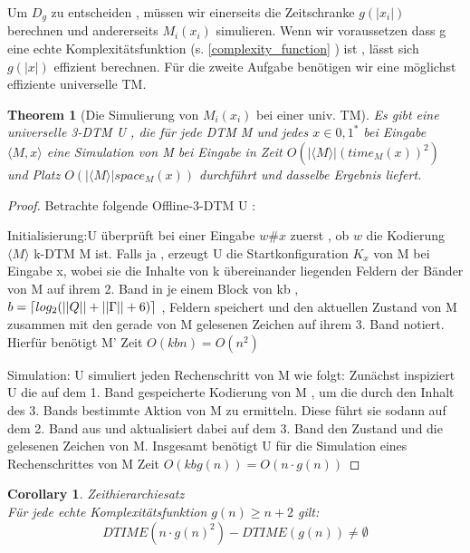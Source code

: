 \documentclass{article}
\newtheorem{theorem}{Theorem}
\newtheorem{corollary}{Corollary}[theorem]
\def\mathify#1{\ifmmode{#1}\else\mbox{$#1$}\fi} %
\newcommand{\ceil}[1]{\mathify{\left\lceil {#1}\right\rceil}}
\begin{document}
	Um $D_g$ zu entscheiden , müssen wir einerseits die Zeitschranke $g(|x_i|) $ berechnen und andererseits $M_i(x_i)$ simulieren. Wenn wir voraussetzen dass g eine echte Komplexitätsfunktion (s. \ref{complexity_function} ) ist , lässt sich $g(|x|)$ effizient berechnen. Für die zweite Aufgabe benötigen wir eine möglichst effiziente universelle TM.
	
	\begin{theorem}[Die Simulierung von $M_i(x_i)$ bei einer univ.  TM] \label{35}
	Es gibt eine universelle 3-DTM U , die für jede DTM M und jedes $x\in {0 ,1}^*$ bei Eingabe $\langle M , x \rangle$ eine Simulation von M bei Eingabe in Zeit $O(|\langle M \rangle|(time_M(x))^2) $ und Platz $O( | \langle M \rangle | space_M(x))$ durchführt und dasselbe Ergebnis liefert.
	\end{theorem}
	\begin{proof}
		Betrachte folgende Offline-3-DTM U : \\
	\par{Initialisierung:}U überprüft bei einer Eingabe $w\#x$ zuerst , ob $w$ die Kodierung $\langle M \rangle$ k-DTM M ist. Falls ja , erzeugt U die Startkonfiguration $K_x$ von M bei Eingabe x, wobei sie die Inhalte von k übereinander liegenden Feldern der Bänder von M auf ihrem 2. Band in je einem Block von kb , \\$b=\ceil{log_2(||Q|| + ||\Gamma|| + 6)} $ , Feldern speichert und den aktuellen Zustand von M zusammen mit den gerade von M gelesenen Zeichen auf ihrem 3. Band notiert. Hierfür benötigt M' Zeit $O(kbn) = O(n^2)$
	\par{Simulation:} U simuliert jeden Rechenschritt von M wie folgt: Zunächst inspiziert U die auf dem 1. Band gespeicherte Kodierung von M , um die durch den Inhalt des 3. Bands bestimmte Aktion von M zu ermitteln. Diese führt sie sodann auf dem 2. Band aus und aktualisiert dabei auf dem 3. Band den Zustand und die gelesenen Zeichen von M. Insgesamt benötigt U für die Simulation eines Rechenschrittes von M  Zeit $O(kbg(n)) = O(n \cdot g(n))$ 
	\end{proof}
	
	\begin{corollary}{Zeithierarchiesatz\\}
	Für jede echte Komplexitätsfunktion $g(n) \geq n+2$ gilt: 
	\[
	DTIME(n \cdot g(n)^2) - DTIME(g(n)) \neq \emptyset
	\]
	\end{corollary}
\end{document}
